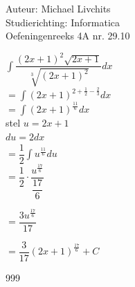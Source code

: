 \documentclass[a4paper]{article}
\begin{document}
  
\noindent \large Auteur: Michael Livchits \\
\noindent \large Studierichting: Informatica\\
\noindent \large Oefeningenreeks 4A nr. 29.10\\

\medskip

\normalsize

$\displaystyle\int\dfrac{(2x+1)^2\sqrt{2x+1}}{\sqrt[3]{(2x+1)^2}}dx$\\

$= \displaystyle\int(2x+1)^{2+\tfrac{1}{2}-\tfrac{2}{3}}dx$\\

$= \displaystyle\int(2x+1)^{\tfrac{11}{6}}dx$\\

stel $u = 2x+1$\\

$du = 2dx$\\

$= \dfrac{1}{2}\displaystyle\int u^{\tfrac{11}{6}}du$\\

$= \dfrac{1}{2}\cdot\dfrac{u^{\tfrac{17}{6}}}{\dfrac{17}{6}}$

$= \dfrac{3u^{\tfrac{17}{6}}}{17}$

$= \dfrac{3}{17}(2x+1)^{\tfrac{17}{6}} + C$

\begin{thebibliography}{999}
\end{thebibliography}
\end{document}
